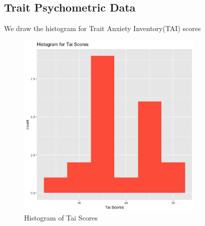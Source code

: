 \documentclass[12pt,epsf]{report}
\begin{document}
\subsection*{Trait Psychometric Data}
We draw the histogram for Trait Anxiety Inventory(TAI) scores\\
\begin{figure}[!ht]
	\centering
	\includegraphics[width=0.8\textwidth]{tai_plot}
	\caption{Histogram of Tai Scores}
	\centering
\end{figure}
\newpage
\end{document}

